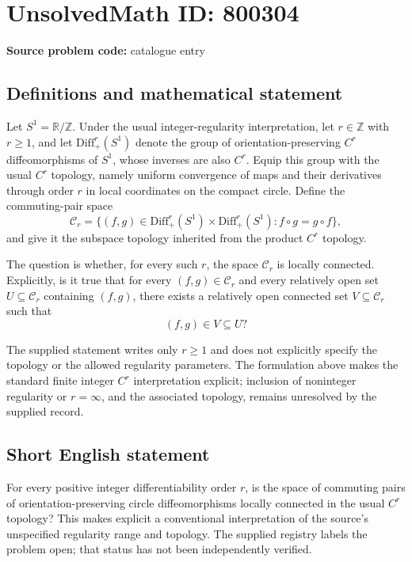 \documentclass[11pt]{article}
\newcommand{\Z}{\mathbb{Z}}
\newcommand{\R}{\mathbb{R}}
\begin{document}
\section*{UnsolvedMath ID: 800304}
\textbf{Source problem code:} catalogue entry
\subsection{Definitions and mathematical statement}
Let \(S^1=\R/\Z\). Under the usual integer-regularity interpretation, let \(r\in\Z\) with \(r\geq 1\), and let \(\mathrm{Diff}_+^r(S^1)\) denote the group of orientation-preserving \(C^r\) diffeomorphisms of \(S^1\), whose inverses are also \(C^r\). Equip this group with the usual \(C^r\) topology, namely uniform convergence of maps and their derivatives through order \(r\) in local coordinates on the compact circle. Define the commuting-pair space
\[
\mathcal C_r=\bigl\{(f,g)\in\mathrm{Diff}_+^r(S^1)\times\mathrm{Diff}_+^r(S^1):f\circ g=g\circ f\bigr\},
\]
and give it the subspace topology inherited from the product \(C^r\) topology.

The question is whether, for every such \(r\), the space \(\mathcal C_r\) is locally connected. Explicitly, is it true that for every \((f,g)\in\mathcal C_r\) and every relatively open set \(U\subseteq\mathcal C_r\) containing \((f,g)\), there exists a relatively open connected set \(V\subseteq\mathcal C_r\) such that
\[
(f,g)\in V\subseteq U?
\]

The supplied statement writes only \(r\geq1\) and does not explicitly specify the topology or the allowed regularity parameters. The formulation above makes the standard finite integer \(C^r\) interpretation explicit; inclusion of noninteger regularity or \(r=\infty\), and the associated topology, remains unresolved by the supplied record.
\subsection{Short English statement}
For every positive integer differentiability order \(r\), is the space of commuting pairs of orientation-preserving circle diffeomorphisms locally connected in the usual \(C^r\) topology? This makes explicit a conventional interpretation of the source's unspecified regularity range and topology. The supplied registry labels the problem open; that status has not been independently verified.
\end{document}
